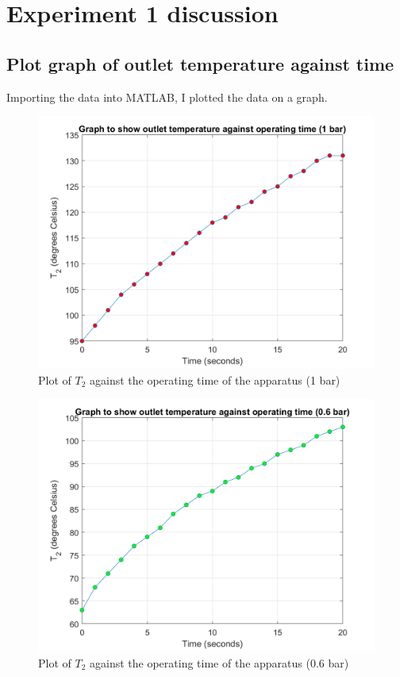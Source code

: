 \documentclass[class=article, crop=false, 12pt,a4paper]{standalone}
\begin{document}
\section{Experiment 1 discussion}
\subsection{Plot graph of outlet temperature against time}
Importing the data into MATLAB, I plotted the data on a graph.
\begin{figure}
  \includegraphics[width = 0.9 \textwidth]{./img/T21vsTimeGraph}
  \caption{Plot of \(T_2\) against the operating time of the apparatus (1 bar)}
  \label{ref:T21vsTime1bar}
\end{figure}
\begin{figure}
  \includegraphics[width = 0.9 \textwidth]{./img/T206vsTimeGraph}
  \caption{Plot of \(T_2\) against the operating time of the apparatus (0.6 bar)}
  \label{ref:T206vsTime1bar}
\end{figure}
\end{document}
